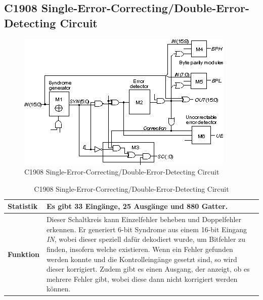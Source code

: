 \subsection*{C1908 Single-Error-Correcting/Double-Error-Detecting Circuit}
\label{sec:c1908}
\begin{figure}[bth]
	\centering
	\includegraphics[scale=0.7]{./img/c1908}
	\caption[C1908 Single-Error-Correcting/Double-Error-Detecting Circuit]{C1908 Single-Error-Correcting/Double-Error-Detecting Circuit \cite{h1999}}
	\label{fig:c1908}
\end{figure}
\begin{table}[bth]
	\centering
	\caption{C1908 Single-Error-Correcting/Double-Error-Detecting Circuit}
	\label{tab:c1908}
	\begin{tabular}{ | p{2cm} | p{12cm} |}
		\hline
		\textbf{Statistik} & Es gibt 33 Eingänge, 25 Ausgänge und 880 Gatter. \\\hline
		\textbf{Funktion} & Dieser Schaltkreis kann Einzelfehler beheben und Doppelfehler erkennen. Er generiert 6-bit Syndrome aus einem 16-bit Eingang \emph{IN}, wobei dieser speziell dafür dekodiert wurde, um Bitfehler zu finden, insofern welche existieren. Wenn ein Fehler gefunden werden konnte und die Kontrolleingänge gesetzt sind, so wird dieser korrigiert. Zudem gibt es einen Ausgang, der anzeigt, ob es mehrere Fehler gibt, wobei diese dann nicht korrigiert werden können. \\\hline
	\end{tabular}
\end{table}
\newpage
